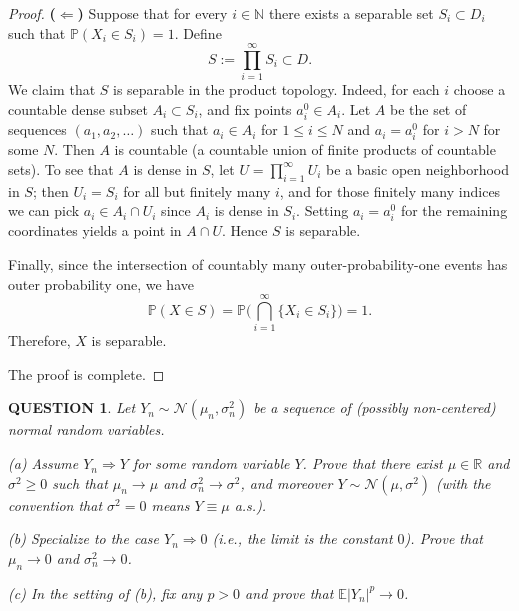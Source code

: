 \documentclass[12pt]{article}
\renewcommand{\(}{\left(}%
\renewcommand{\)}{\right)}%
\renewcommand{\[}{\left[}%
\renewcommand{\]}{\right]}%
\newtheorem{question}{QUESTION}[section]}
\newtheorem{proof}{Proof.}}
\begin{document}
\begin{proof}
\medskip
\noindent
\textbf{($\Leftarrow$)} Suppose that for every $i\in\mathbb N$ there exists a separable
set $S_i\subset D_i$ such that $\mathbb P(X_i\in S_i)=1$. Define
\begin{equation*}
S := \prod_{i=1}^\infty S_i \subset D.
\end{equation*}
We claim that $S$ is separable in the product topology. Indeed, for each $i$ choose
a countable dense subset $A_i\subset S_i$, and fix points $a_i^0\in A_i$. Let $A$ be
the set of sequences $(a_1,a_2,\dots)$ such that $a_i\in A_i$ for $1\le i\le N$ and
$a_i=a_i^0$ for $i>N$ for some $N$. Then $A$ is countable (a countable union of finite
products of countable sets). To see that $A$ is dense in $S$, let
$U=\prod_{i=1}^\infty U_i$ be a basic open neighborhood in $S$; then $U_i=S_i$ for all
but finitely many $i$, and for those finitely many indices we can pick
$a_i\in A_i\cap U_i$ since $A_i$ is dense in $S_i$. Setting $a_i=a_i^0$ for the remaining
coordinates yields a point in $A\cap U$. Hence $S$ is separable.

Finally, since the intersection of countably many outer-probability-one events has
outer probability one, we have
\begin{equation*}
\mathbb P(X\in S)
=
\mathbb P\Big(\bigcap_{i=1}^\infty \{X_i\in S_i\}\Big)
=1.
\end{equation*}
Therefore, $X$ is separable.

\medskip
\noindent
The proof is complete.
\end{proof}

\begin{question}
Let $Y_n\sim \mathcal N(\mu_n,\sigma_n^2)$ be a sequence of (possibly non-centered) normal random variables.

\smallskip
\noindent (a) Assume $Y_n \Rightarrow Y$ for some random variable $Y$. Prove that there exist $\mu\in\mathbb R$ and $\sigma^2\ge 0$ such that $\mu_n\to \mu$ and $\sigma_n^2\to \sigma^2$, and moreover $Y\sim \mathcal N(\mu,\sigma^2)$ (with the convention that $\sigma^2=0$ means $Y\equiv \mu$ a.s.).

\smallskip
\noindent (b) Specialize to the case $Y_n \Rightarrow 0$ (i.e., the limit is the constant $0$). Prove that $\mu_n\to 0$ and $\sigma_n^2\to 0$.

\smallskip
\noindent (c) In the setting of (b), fix any $p>0$ and prove that $\mathbb E|Y_n|^p\to 0$.
\end{question}
\end{document}
